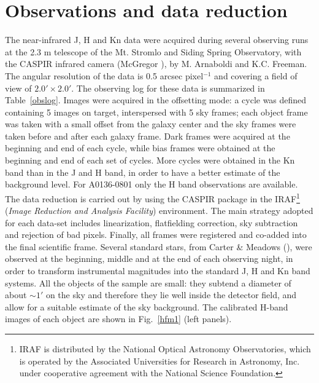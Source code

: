 \documentclass{aa}
\begin{document}
\section{Observations and data reduction}\label{observations}
The near-infrared J, H  and Kn data were acquired during several 
observing runs at the 2.3 m telescope of the Mt. Stromlo and Siding Spring 
Observatory, with the CASPIR infrared camera (McGregor \cite{McG94}), by 
M. Arnaboldi and K.C. Freeman. 
The angular resolution of the data is 0.5 arcsec pixel$^{-1}$ and covering
a field of view of $2.0' \times 2.0'$.
The observing log for these data is summarized in Table~\ref{obslog}.
Images were acquired in the offsetting mode: a cycle was defined containing
5 images on target, interspersed with 5 sky frames; each object frame was taken 
with a small offset from the galaxy center and the sky frames were taken before 
and after each galaxy frame. Dark frames were acquired at the beginning and end
of each cycle, while bias frames were obtained at the beginning and end of 
each set of cycles. 
More cycles were obtained in the Kn band than in the J and H band, in order
to have a better estimate of the background level.
For A0136-0801 only the H band observations are available.
The data reduction is carried out by using the CASPIR package in the 
IRAF\footnote{IRAF is distributed by the National Optical Astronomy 
Observatories,  which is operated by the Associated Universities for
Research in Astronomy, 
Inc. under cooperative agreement with the National Science Foundation.} 
({\it Image Reduction and  Analysis Facility}) environment.
The main strategy adopted for each data-set includes linearization,  
flatfielding 
correction, sky subtraction and rejection of bad pixels. Finally,
all frames were registered and co-added into the final scientific frame.
Several standard stars, from Carter \& Meadows (\cite{carter95}), were  
observed at the beginning, middle and at the end of each observing night,
in order to transform
instrumental magnitudes into the standard J, H and Kn band systems.
All the objects of the sample are small: they subtend a diameter of
about $\sim 1'$ on the sky and therefore they lie well inside the detector
field, and allow for a suitable estimate of the sky background. 
The calibrated H-band images of each object are shown in 
Fig.~\ref{hfm1} (left panels).
\end{document}
